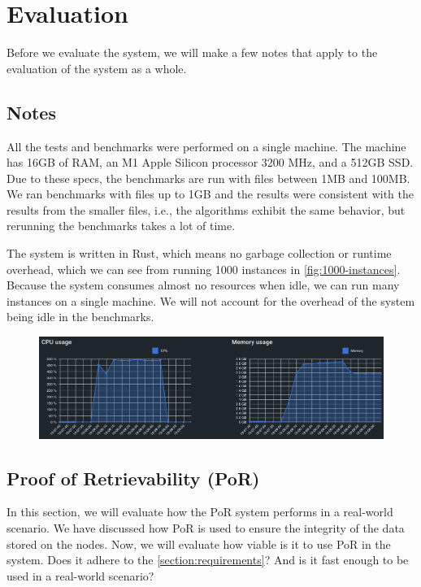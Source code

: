 \chapter{Evaluation}
\label{chapter:evaluation}

Before we evaluate the system, we will make a few notes that apply to the evaluation of the system as a whole.

\section{Notes}

All the tests and benchmarks were performed on a single machine.
The machine has 16GB of RAM, an M1 Apple Silicon processor 3200 MHz, and a 512GB SSD.
Due to these specs, the benchmarks are run with files between 1MB and 100MB.
We ran benchmarks with files up to 1GB and the results were consistent with the results from the smaller files,
i.e., the algorithms exhibit the same behavior, but rerunning the benchmarks takes a lot of time.

The system is written in Rust, which means no garbage collection or runtime overhead,
which we can see from running 1000 instances in \autoref{fig:1000-instances}.
Because the system consumes almost no resources when idle,
we can run many instances on a single machine.
We will not account for the overhead of the system being idle in the benchmarks.

\begin{figure}
    \centering
    \includegraphics[width=350pt]{gfx/1000-instances.png}
    \label{fig:1000-instances}
\end{figure}

\section{Proof of Retrievability (PoR)}
\label{section:por-evaluation}

In this section, we will evaluate how the PoR system performs in a real-world scenario.
We have discussed how PoR is used to ensure the integrity of the data stored on the nodes.
Now, we will evaluate how viable is it to use PoR in the system.
Does it adhere to the \autoref{section:requirements}?
And is it fast enough to be used in a real-world scenario?

